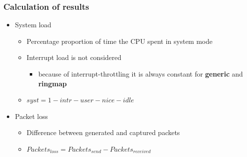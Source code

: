 \documentclass{beamer}
\begin{document}
%
%
\begin{frame}
\frametitle{Calculation of results}
\begin{itemize}
	\item System load
		\begin{itemize}
			\item Percentage proportion of time the CPU spent in system mode
			\item Interrupt load is not considered
				\begin{itemize}
					\item because of interrupt-throttling it is always constant for \textbf{generic} and \textbf{ringmap}
				\end{itemize}
			\item $syst = 1 - intr - user - nice - idle$\newline
		\end{itemize}
	\item Packet loss
		\begin{itemize}
			\item Difference between generated and captured packets
			\item $Packets_{loss} = Packets_{send} - Packets_{received}$
		\end{itemize}
\end{itemize}
\end{frame}
\end{document}
